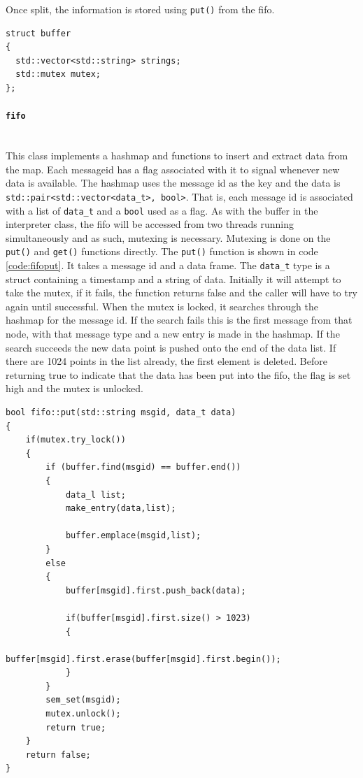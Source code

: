 Once split, the information is stored using \texttt{put()} from the fifo. 
\begin{lstlisting}[caption=Buffer for holding incoming messages,label=code:msgbuffer]
struct buffer 
{
  std::vector<std::string> strings;
  std::mutex mutex;
};
\end{lstlisting}
\paragraph*{\texttt{fifo}}~\\
This class implements a hashmap and functions to insert and extract data from the map.
Each messageid has a flag associated with it to signal whenever new data is available.
The hashmap uses the message id as the key and the data is \texttt{std::pair<std::vector<data\_t>, bool>}.
That is, each message id is associated with a list of \texttt{data\_t} and a \texttt{bool} used as a flag.
As with the buffer in the interpreter class, the fifo will be accessed from two threads running simultaneously and as such, mutexing is necessary.
Mutexing is done on the \texttt{put()} and \texttt{get()} functions directly.
The \texttt{put()} function is shown in code \ref{code:fifoput}.
It takes a message id and a data frame.
The \texttt{data\_t} type is a struct containing a timestamp and a string of data.
Initially it will attempt to take the mutex, if it fails, the function returns false and the caller will have to try again until successful.
When the mutex is locked, it searches through the hashmap for the message id.
If the search fails this is the first message from that node, with that message type and a new entry is made in the hashmap.
If the search succeeds the new data point is pushed onto the end of the data list.
If there are 1024 points in the list already, the first element is deleted.
Before returning true to indicate that the data has been put into the fifo, the flag is set high and the mutex is unlocked.

\begin{lstlisting}[caption=Function used to insert new data into the hashmap,label=code:fifoput]
bool fifo::put(std::string msgid, data_t data)
{
	if(mutex.try_lock())
	{	
		if (buffer.find(msgid) == buffer.end())
		{
			data_l list;
			make_entry(data,list);

			buffer.emplace(msgid,list);
		}
		else
		{
			buffer[msgid].first.push_back(data);
			
			if(buffer[msgid].first.size() > 1023)
			{
				buffer[msgid].first.erase(buffer[msgid].first.begin());
			}
		}
		sem_set(msgid);
		mutex.unlock();
		return true;
	}
	return false;
}
\end{lstlisting}

